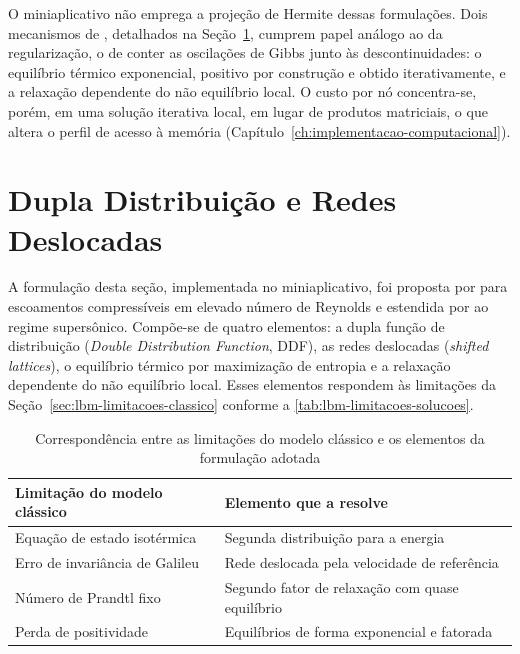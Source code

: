 O miniaplicativo não emprega a projeção de Hermite dessas formulações.
Dois mecanismos de \textcite{Tran2022}, detalhados na Seção~\ref{sec:lbm-dupla-distribuicao}, cumprem papel análogo ao da regularização, o de conter as oscilações de Gibbs junto às descontinuidades: o equilíbrio térmico exponencial, positivo por construção e obtido iterativamente, e a relaxação dependente do não equilíbrio local.
O custo por nó concentra-se, porém, em uma solução iterativa local, em lugar de produtos matriciais, o que altera o perfil de acesso à memória (Capítulo~\ref{ch:implementacao-computacional}).


\section{Dupla Distribuição e Redes Deslocadas}\label{sec:lbm-dupla-distribuicao}

A formulação desta seção, implementada no miniaplicativo, foi proposta por \textcite{Tran2022} para escoamentos compressíveis em elevado número de Reynolds e estendida por \textcite{Rathnayake2024} ao regime supersônico.
Compõe-se de quatro elementos: a dupla função de distribuição (\textit{Double Distribution Function}, DDF), as redes deslocadas (\textit{shifted lattices}), o equilíbrio térmico por maximização de entropia e a relaxação dependente do não equilíbrio local.
Esses elementos respondem às limitações da Seção~\ref{sec:lbm-limitacoes-classico} conforme a \autoref{tab:lbm-limitacoes-solucoes}.

\begin{table}[H]
    \centering
    \caption{Correspondência entre as limitações do modelo clássico e os elementos da formulação adotada}
    \label{tab:lbm-limitacoes-solucoes}
    \begin{tabular}{p{5.5cm}p{7.0cm}}
        \toprule
        Limitação do modelo clássico & Elemento que a resolve \\
        \midrule
        Equação de estado isotérmica & Segunda distribuição para a energia \\
        Erro de invariância de Galileu & Rede deslocada pela velocidade de referência \\
        Número de Prandtl fixo & Segundo fator de relaxação com quase equilíbrio \\
        Perda de positividade & Equilíbrios de forma exponencial e fatorada \\
        \bottomrule
    \end{tabular}
\end{table}


